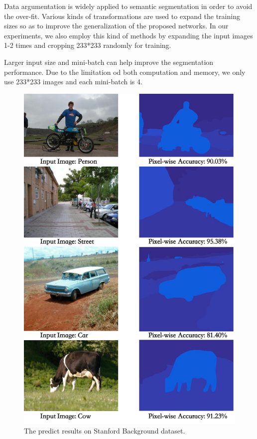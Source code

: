 \documentclass[10.5pt,compsoc]{TsT}
\theoremstyle{mystyle}
\begin{document}
{Data argumentation is widely applied to semantic segmentation in order to avoid the over-fit. Various kinds of transformations are used to expand the training sizes so as to improve the generalization of the proposed networks. In our experiments, we also employ this kind of methods by expanding the input images 1-2 times and cropping 233*233 randomly for training.  

Larger input size and mini-batch can help improve the segmentation performance. Due to the limitation od both computation and memory, we only use 233*233 images and each mini-batch is 4.


\begin{figure}
\centering
\includegraphics[width=0.95\columnwidth]{fig4.png}
\caption{The predict results on Stanford Background dataset.}
\label{fig:stanford}
\end{figure} 

}
\end{document}
